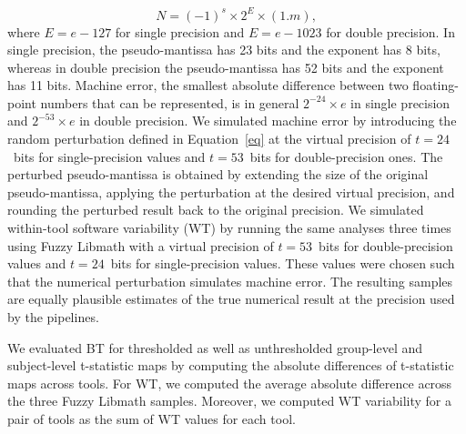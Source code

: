 \documentclass[11pt,onecolumn]{article}
\begin{document}
\begin{equation}
  N = (-1)^s \times 2^E \times (1.m),
\end{equation}
where $E=e-127$ for single precision and $E=e-1023$ for double precision.
In single precision, the pseudo-mantissa has 23 bits and the exponent has 8 bits, whereas in 
double precision the pseudo-mantissa has 52 bits and the exponent has 11 bits. 
Machine error, the smallest absolute difference between two
floating-point numbers that can be represented, is in general $2^{-24}\times e$ in
single precision and $2^{-53}\times e$ in double precision.
We simulated machine error by introducing the random perturbation defined
in Equation~\ref{eq} at the virtual precision of $t=24$~bits for single-precision 
values and $t=53$~bits for double-precision ones. The perturbed pseudo-mantissa
is obtained by extending the size of the original pseudo-mantissa, applying the perturbation 
at the desired virtual precision, and rounding the perturbed result
 back to the original precision.  
We simulated within-tool software variability (WT) by running the same analyses three
times using Fuzzy Libmath with a virtual precision of $t=53$~bits for
double-precision values and $t=24$~bits for single-precision values. 
These values were chosen such that the numerical perturbation simulates machine error.
The resulting samples are equally plausible estimates of
the true numerical result at the precision used by the pipelines. 

We evaluated BT for thresholded as well as unthresholded
group-level and subject-level t-statistic maps by computing the absolute
differences of t-statistic maps across tools. For WT, we computed the
average absolute difference across the three Fuzzy Libmath samples.
Moreover, we computed WT variability for a pair of tools as the sum of WT values for each tool.
\end{document}
